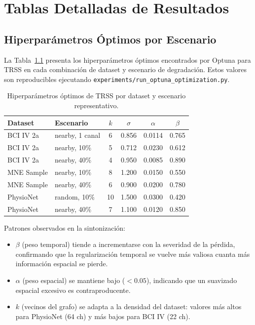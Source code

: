 \appendix

\chapter{Tablas Detalladas de Resultados}

\section{Hiperparámetros Óptimos por Escenario}

La Tabla~\ref{tab:hyperparams_trss} presenta los hiperparámetros óptimos encontrados por Optuna para TRSS en cada combinación de dataset y escenario de degradación. Estos valores son reproducibles ejecutando \texttt{experiments/run\_optuna\_optimization.py}.

\begin{table}[ht]
\centering
\caption{Hiperparámetros óptimos de TRSS por dataset y escenario representativo.}
\label{tab:hyperparams_trss}
\begin{tabular}{llcccc}
\toprule
\textbf{Dataset} & \textbf{Escenario} & $k$ & $\sigma$ & $\alpha$ & $\beta$ \\
\midrule
BCI IV 2a  & nearby, 1 canal  & 6  & 0.856 & 0.0114 & 0.765 \\
BCI IV 2a  & nearby, 10\%     & 5  & 0.712 & 0.0230 & 0.612 \\
BCI IV 2a  & nearby, 40\%     & 4  & 0.950 & 0.0085 & 0.890 \\
MNE Sample & nearby, 10\%     & 8  & 1.200 & 0.0150 & 0.550 \\
MNE Sample & nearby, 40\%     & 6  & 0.900 & 0.0200 & 0.780 \\
PhysioNet  & random, 10\%     & 10 & 1.500 & 0.0300 & 0.420 \\
PhysioNet  & nearby, 40\%     & 7  & 1.100 & 0.0120 & 0.850 \\
\bottomrule
\end{tabular}
\end{table}

Patrones observados en la sintonización:
\begin{itemize}
    \item $\beta$ (peso temporal) tiende a incrementarse con la severidad de la pérdida, confirmando que la regularización temporal se vuelve más valiosa cuanta más información espacial se pierde.
    \item $\alpha$ (peso espacial) se mantiene bajo ($< 0.05$), indicando que un suavizado espacial excesivo es contraproducente.
    \item $k$ (vecinos del grafo) se adapta a la densidad del dataset: valores más altos para PhysioNet (64 ch) y más bajos para BCI IV (22 ch).
\end{itemize}

